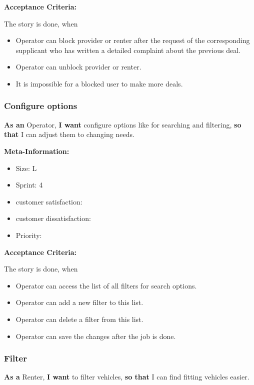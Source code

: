 \textbf{Acceptance Criteria:}

The story is done, when
\begin{itemize}
    \item Operator can block provider or renter after the request of the corresponding supplicant who has written a detailed complaint about the previous deal.
    \item Operator can unblock provider or renter.
    \item It is impossible for a blocked user to make more deals.
\end{itemize}

\subsubsection{Configure options}

\textbf{As an} Operator,\hfill\break
\textbf{I want} configure options like for searching and filtering,\hfill\break
\textbf{so that} I can adjust them to changing needs.

\textbf{Meta-Information:}
\begin{itemize}
    \item Size: L
    \item Sprint: 4
    \item customer satisfaction:
    \item customer dissatisfaction:
    \item Priority:
\end{itemize}

\textbf{Acceptance Criteria:}

The story is done, when
\begin{itemize}
    \item Operator can access the list of all filters for search options.
    \item Operator can add a new filter to this list.
    \item Operator can delete a filter from this list.
    \item Operator can save the changes after the job is done.
\end{itemize}

\subsubsection{Filter}

\textbf{As a} Renter,\hfill\break
\textbf{I want} to filter vehicles,\hfill\break
\textbf{so that} I can find fitting vehicles easier.


